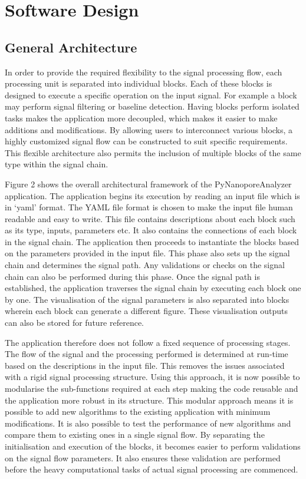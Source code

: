\documentclass[journal]{IEEEtran}
\begin{document}
\section{Software Design}
\subsection{General Architecture}
In order to provide the required flexibility to the signal processing flow, each processing unit is separated into individual blocks. Each of these blocks is designed to execute a specific operation on the input signal. For example a block may perform signal filtering or baseline detection. Having blocks perform isolated tasks makes the application more decoupled, which makes it easier to make additions and modifications. By allowing users to interconnect various blocks, a highly customized signal flow can be constructed to suit specific requirements. This flexible architecture also permits the inclusion of multiple blocks of the same type within the signal chain. 

Figure 2 shows the overall architectural framework of the PyNanoporeAnalyzer application. The application begins its execution by reading an input file which is in ‘yaml’ format. The YAML file format is chosen to make the input file human readable and easy to write. This file contains descriptions about each block such as its type, inputs, parameters etc. It also contains the connections of each block in the signal chain. The application then proceeds to instantiate the blocks based on the parameters provided in the input file. This phase also sets up the signal chain and determines the signal path. Any validations or checks on the signal chain can also be performed during this phase. Once the signal path is established, the application traverses the signal chain by executing each block one by one. The visualisation of the signal parameters is also separated into blocks wherein each block can generate a different figure. These visualisation outputs can also be stored for future reference.
	
The application therefore does not follow a fixed sequence of processing stages. The flow of the signal and the processing performed is determined at run-time based on the descriptions in the input file. This removes the issues associated with a rigid signal processing structure. Using this approach, it is now possible to modularise the sub-functions required at each step making the code reusable and the application more robust in its structure. This modular approach means it is possible to add new algorithms to the existing application with minimum modifications. It is also possible to test the performance of new algorithms and compare them to existing ones in a single signal flow. By separating the initialisation and execution of the blocks, it becomes easier to perform validations on the signal flow parameters. It also ensures these validation are performed before the heavy computational tasks of actual signal processing are commenced. 
\end{document}
